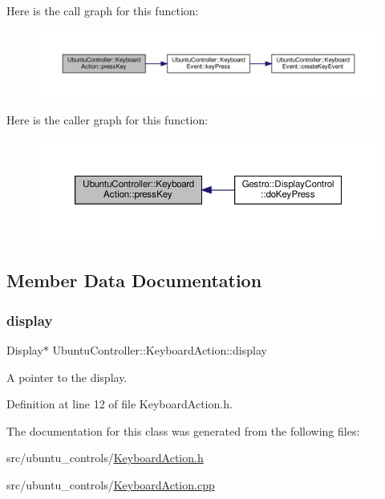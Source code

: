 Here is the call graph for this function\+:
\nopagebreak
\begin{figure}[H]
\begin{center}
\leavevmode
\includegraphics[width=350pt]{class_ubuntu_controller_1_1_keyboard_action_ab09e3956685d6fb11cd1cdf86a673b48_cgraph}
\end{center}
\end{figure}
Here is the caller graph for this function\+:
\nopagebreak
\begin{figure}[H]
\begin{center}
\leavevmode
\includegraphics[width=350pt]{class_ubuntu_controller_1_1_keyboard_action_ab09e3956685d6fb11cd1cdf86a673b48_icgraph}
\end{center}
\end{figure}


\subsection{Member Data Documentation}
\mbox{\label{class_ubuntu_controller_1_1_keyboard_action_abd7bb1af29077e744e9226f6bf1ecab7}} 
\subsubsection{\texorpdfstring{display}{display}}
{\footnotesize\ttfamily Display$\ast$ Ubuntu\+Controller\+::\+Keyboard\+Action\+::display\hspace{0.3cm}{\ttfamily [private]}}



A pointer to the display. 



Definition at line 12 of file Keyboard\+Action.\+h.



The documentation for this class was generated from the following files\+:\begin{DoxyCompactItemize}
\item 
src/ubuntu\+\_\+controls/\hyperlink{_keyboard_action_8h}{Keyboard\+Action.\+h}\item 
src/ubuntu\+\_\+controls/\hyperlink{_keyboard_action_8cpp}{Keyboard\+Action.\+cpp}\end{DoxyCompactItemize}
